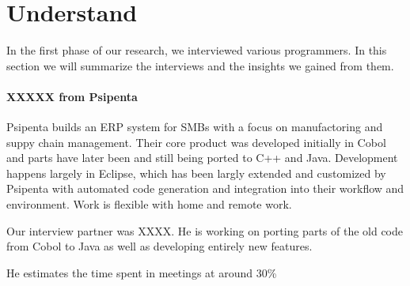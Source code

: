 \section{Understand}
\label{sec:understand}

In the first phase of our research, we interviewed various programmers. In this section we will summarize the interviews and the insights we gained from them.

\paragraph{XXXXX from Psipenta} Psipenta builds an ERP system for SMBs with a focus on manufactoring and suppy chain management. Their core product was developed initially in Cobol and parts have later been and still being ported to C++ and Java. Development happens largely in Eclipse, which has been largly extended and customized by Psipenta with automated code generation and integration into their workflow and environment. Work is flexible with home and remote work.

Our interview partner was XXXX. He is working on porting parts of the old code from Cobol to Java as well as developing entirely new features.

He estimates the time spent in meetings at around 30\%


